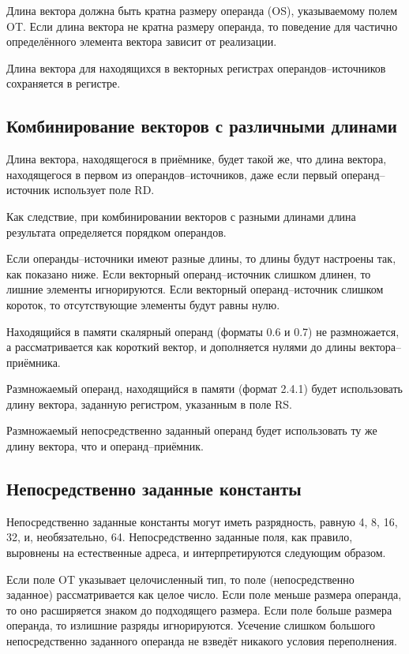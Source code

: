 \documentclass[forwardcom.tex]{subfiles}
\begin{document}
Длина вектора должна быть кратна размеру операнда (OS), указываемому полем OT. Если длина вектора не кратна размеру операнда, то поведение для частично определённого элемента вектора зависит от реализации.

Длина вектора для находящихся в векторных регистрах операндов--источников сохраняется в регистре.

\subsection{Комбинирование векторов с различными длинами}
Длина вектора, находящегося в приёмнике, будет такой же, что  длина вектора, находящегося в первом из операндов--источников, даже если первый операнд--источник использует поле RD.

Как следствие, при комбинировании векторов с разными длинами длина результата определяется порядком операндов.

Если операнды--источники имеют разные длины, то длины будут настроены так, как показано ниже. Если векторный операнд--источник слишком длинен, то лишние элементы игнорируются. Если векторный операнд--источник слишком короток, то отсутствующие элементы будут равны нулю.

Находящийся в памяти скалярный операнд (форматы 0.6 и 0.7) не размножается, а рассматривается как короткий вектор, и дополняется нулями до длины вектора--приёмника.

Размножаемый операнд, находящийся в памяти (формат 2.4.1) будет использовать длину вектора, заданную регистром, указанным в поле RS.

Размножаемый непосредственно заданный операнд будет использовать ту же длину вектора, что и операнд--приёмник.

\subsection{Непосредственно заданные константы}
Непосредственно заданные константы могут иметь разрядность, равную 4, 8, 16, 32, и, необязательно, 64. Непосредственно заданные поля, как правило, выровнены на естественные адреса, и интерпретируются следующим образом.

Если поле OT указывает целочисленный тип, то поле (непосредственно заданное) рассматривается как целое число. Если поле меньше размера операнда, то оно расширяется знаком до подходящего размера. Если поле больше размера операнда, то излишние разряды игнорируются. Усечение слишком большого непосредственно заданного операнда не взведёт никакого условия переполнения.
\end{document}
